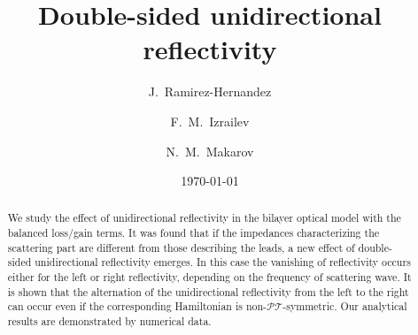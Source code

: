 \documentclass[aps,pra,reprint,showpacs,bibnotes,preprintnumbers,twoside,eqsecnum]{revtex4-1}
\begin{document}

\title{Double-sided unidirectional reflectivity}
\author{J.~Ramirez-Hernandez}

\author{F.~M.~Izrailev}

\author{N.~M.~Makarov}

\date{\today}

\begin{abstract}
We study the effect of unidirectional reflectivity in the bilayer optical model with the balanced loss/gain terms. It was found that if the impedances characterizing the scattering part are different from those describing the leads, a new effect of double-sided unidirectional reflectivity emerges. In this case the vanishing of reflectivity occurs either for the left or right reflectivity, depending on the frequency of scattering wave. It is shown that the alternation of the unidirectional reflectivity from the left to the right can occur even if the corresponding Hamiltonian is non-$\mathcal{P}\mathcal{T}$-symmetric. Our analytical results are demonstrated by numerical data.
\end{abstract}
\end{document}
